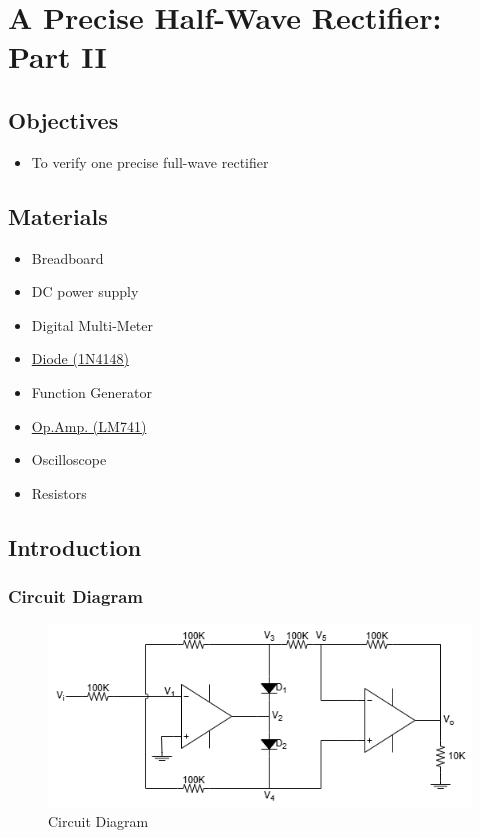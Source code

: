 \chapter{A Precise Half-Wave Rectifier: Part II}


\section{Objectives}
\begin{itemize}
    \item To verify one precise full-wave rectifier
\end{itemize}

\section{Materials}
\begin{itemize}
    \item Breadboard
    \item DC power supply
    \item Digital Multi-Meter
    \item \hyperref[1N4148]{Diode (1N4148)}
    \item Function Generator
    \item \hyperref[LM741_1]{Op.Amp. (LM741)}
    \item Oscilloscope
    \item Resistors
\end{itemize}

\section{Introduction}
    \subsection{Circuit Diagram}
    \begin{figure}[h]
        \centering
        \includegraphics[width=0.7\linewidth]{Lab14/Lab14.drawio.png}
        \caption{Circuit Diagram}
        \label{l14f}
    \end{figure}
    \FloatBarrier

